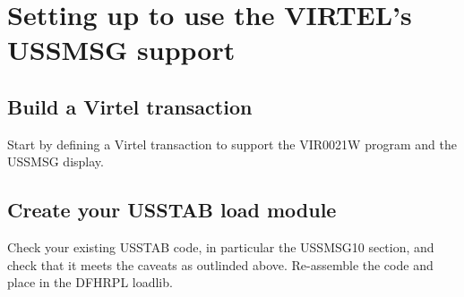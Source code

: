 \documentclass[letterpaper,10pt,english]{sphinxmanual}
\begin{document}
\section{Setting up to use the VIRTEL’s USSMSG support}
\label{\detokenize{Customization:setting-up-to-use-the-virtel-s-ussmsg-support}}

\subsection{Build a Virtel transaction}
\label{\detokenize{Customization:build-a-virtel-transaction}}
Start by defining a Virtel transaction to support the VIR0021W program and the USSMSG display.

\begin{sphinxVerbatim}[commandchars=\\\{\}]
                                              
                                                   
                                    
                                                  
                                                         
                                                 
                                                      
                                                     
\end{sphinxVerbatim}




\subsection{Create your USSTAB load module}
\label{\detokenize{Customization:create-your-usstab-load-module}}
Check your existing USSTAB code, in particular the USSMSG10 section, and check that it meets the caveats as outlinded above. Re-assemble the code and place in the DFHRPL loadlib.
\end{document}
